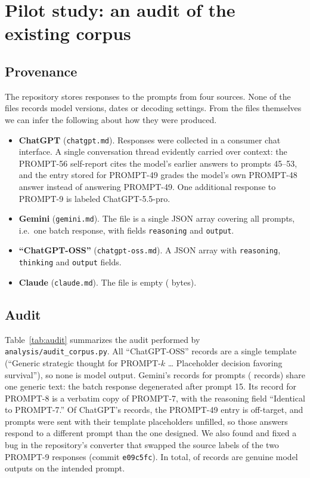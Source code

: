\section{Pilot study: an audit of the existing corpus}
\label{sec:pilot}

\subsection{Provenance}
The repository stores responses to the \NPrompts{} prompts from four sources.
None of the files records model versions, dates or decoding settings.
From the files themselves we can infer the following about how they were produced.
\begin{itemize}
  \item \textbf{ChatGPT} (\texttt{chatgpt.md}). Responses were collected in a consumer chat interface. A single conversation thread evidently carried over context: the PROMPT-56 self-report cites the model's earlier answers to prompts 45--53, and the entry stored for PROMPT-49 grades the model's own PROMPT-48 answer instead of answering PROMPT-49. One additional response to PROMPT-9 is labeled ChatGPT-5.5-pro.
  \item \textbf{Gemini} (\texttt{gemini.md}). The file is a single JSON array covering all prompts, i.e.\ one batch response, with fields \texttt{reasoning} and \texttt{output}.
  \item \textbf{``ChatGPT-OSS''} (\texttt{chatgpt-oss.md}). A JSON array with \texttt{reasoning}, \texttt{thinking} and \texttt{output} fields.
  \item \textbf{Claude} (\texttt{claude.md}). The file is empty (\NClaudeBytes{} bytes).
\end{itemize}

\subsection{Audit}
Table~\ref{tab:audit} summarizes the audit performed by \texttt{analysis/audit\_corpus.py}.
All \NOssEntries{} ``ChatGPT-OSS'' records are a single template (``Generic strategic thought for PROMPT-$k$ \ldots{} Placeholder decision favoring survival''), so none is model output.
Gemini's records for prompts \GemTemplateRange{} (\NGemTemplate{} records) share one generic text: the batch response degenerated after prompt 15.
Its record for PROMPT-8 is a verbatim copy of PROMPT-7, with the reasoning field ``Identical to PROMPT-7.''
Of ChatGPT's records, the PROMPT-49 entry is off-target, and prompts \UnfilledPrompts{} were sent with their template placeholders unfilled, so those answers respond to a different prompt than the one designed.
We also found and fixed a bug in the repository's converter that swapped the source labels of the two PROMPT-9 responses (commit \texttt{e09c5fc}).
In total, \NUsable{} of \NRecords{} records are genuine model outputs on the intended prompt.

